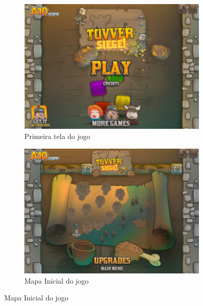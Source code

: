 \documentclass[12pt]{article}
\begin{document}
\begin{figure}[h]
\begin{subfigure}{0.5\textwidth}
\includegraphics[scale=0.3]{imagens/menuprincipal.png}
\caption{Primeira tela do jogo}
\label{fig:menuprincipal}
\end{subfigure}
\begin{subfigure}{0.5\textwidth}
\includegraphics[scale=0.3]{imagens/mapainicial.png} 
\caption{Mapa Inicial do jogo}
\label{fig:mapainicial}
\end{subfigure}
\end{figure}
\end{document}
